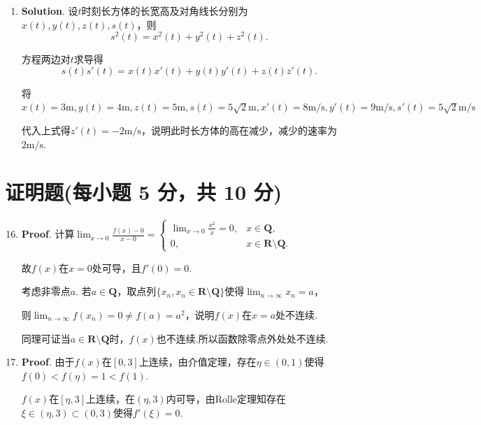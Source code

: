 \documentclass[../Main.tex]{subfiles}
\begin{document}
\begin{enumerate}
          因此必须$\begin{cases}
                  r-1=2, \\
                  cr=1
              \end{cases}$，解得$r=3,c=\frac{1}{3}$.

          所以$u(x)$的主部为$\frac{1}{3}x^{3}$，阶数为3.

    \item \textbf{Solution}. 设$t$时刻长方体的长宽高及对角线长分别为$x(t),y(
              t),z(t),s(t)$，则
          \[
              s^{2}(t)=x^{2}(t)+y^{2}(t)+z^{2}(t).
          \]

          方程两边对$t$求导得
          \[
              s(t)s'(t)=x(t)x'(t)+y(t)y'(t)+z(t)z'(t).
          \]

          将$x(t)=3\mathrm{m},y(t)=4\mathrm{m},z(t)=5\mathrm{m},s(t)=5\sqrt{2}\mathrm{m}
              ,x'(t)=8\mathrm{m/s},y'(t)=9\mathrm{m/s},s'(t)=5\sqrt{2}\mathrm{m/s}$

          代入上式得$z'(t)=-2\mathrm{m/s}$，说明此时长方体的高在减少，减少的速率为$2\mathrm{m/s}$.
\end{enumerate}

\section{证明题(每小题 5 分，共 10 分)}
\begin{enumerate}
    \setcounter{enumi}{15}
    \item \textbf{Proof}. 计算$\lim_{x\to0}\frac{f(x)-0}{x-0}=
              \begin{cases}
                  \lim_{x\to0}\frac{x^2}{x}=0, & x\in\mathbf{Q},                    \\
                  0,                           & x\in\mathbf{R}\setminus\mathbf{Q}.
              \end{cases}$

          故$f(x)$在$x=0$处可导，且$f'(0)=0$.

          考虑非零点$a$. 若$a\in\mathbf{Q}$，取点列$\{x_{n},x_{n}\in\mathbf{R}\setminus
              \mathbf{Q}\}$使得$\lim_{n\to\infty}x_{n}=a$，

          则$\lim_{n\to\infty}f(x_{n})=0\neq f(a)=a^{2}$，说明$f(x)$在$x=a$处不连续.

          同理可证当$a\in\mathbf{R}\setminus\mathbf{Q}$时，$f(x)$也不连续.所以函数除零点外处处不连续.

    \item \textbf{Proof}. 由于$f(x)$在$[0,3]$上连续，由介值定理，存在$\eta\in
              (0,1)$使得$f(0)<f(\eta)=1<f(1)$.

          $f(x)$在$[\eta,3]$上连续，在$(\eta,3)$内可导，由Rolle定理知存在$\xi\in(\eta
              ,3)\subset(0,3)$使得$f'(\xi)=0$.
\end{enumerate}
\end{document}
